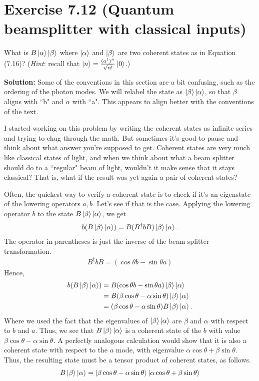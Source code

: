 \documentclass{book}
\begin{document}
\section*{Exercise 7.12 (Quantum beamsplitter with classical inputs)}
    What is $B\ket{\alpha}\ket{\beta}$ where $\ket{\alpha}$ and $\ket{\beta}$ are two coherent states as in Equation (7.16)? (\emph{Hint}: recall that $\ket{n} = \frac{(a^\dagger)^n}{\sqrt{n!}}\ket{0}$.)

    \textbf{Solution:} Some of the conventions in this section are a bit confusing, such as the ordering of the photon modes. We will relabel the state as $\ket{\beta}\ket{\alpha}$, so that $\beta$ aligns with ``b" and $\alpha$ with ``a". This appears to align better with the conventions of the text. 

    I started working on this problem by writing the coherent states as infinite series and trying to chug through the math. But sometimes it's good to pause and think about what answer you're supposed to get. Coherent states are very much like classical states of light, and when we think about what a beam splitter should do to a ``regular" beam of light, wouldn't it make sense that it stays classical? That is, what if the result was yet again a pair of coherent states?

    Often, the quickest way to verify a coherent state is to check if it's an eigenstate of the lowering operators $a,b$. Let's see if that is the case. Applying the lowering operator $b$ to the state $B\ket{\beta}\ket{\alpha}$, we get
    \begin{align}
        b (B \ket{\beta}\ket{\alpha}) = B (B^\dagger b B) \ket{\beta}\ket{\alpha}.
    \end{align}
    The operator in parentheses is just the inverse of the beam splitter transformation.
    \begin{align}
        B^\dagger b B = (\cos\theta b - \sin\theta a)
    \end{align}
    Hence, 
    \begin{align}
    \begin{aligned}
        b (B \ket{\beta}\ket{\alpha}) &= B (\cos\theta b - \sin\theta a) \ket{\beta}\ket{\alpha} \\
        &= B(\beta \cos\theta - \alpha \sin\theta) \ket{\beta}\ket{\alpha} \\
        &= (\beta \cos\theta - \alpha \sin\theta) B \ket{\beta}\ket{\alpha}.
    \end{aligned}
    \end{align}
    Where we used the fact that the eigenvalues of $\ket{\beta}\ket{\alpha}$ are $\beta$ and $\alpha$ with respect to $b$ and $a$. Thus, we see that $B \ket{\beta}\ket{\alpha}$ is a coherent state of the $b$ with value $\beta \cos\theta - \alpha \sin\theta$. A perfectly analogous calculation would show that it is also a coherent state with respect to the $a$ mode, with eigenvalue $\alpha \cos\theta + \beta \sin\theta$. Thus, the resulting state must be a tensor product of coherent states, as follows.
    \begin{align}
        B \ket{\beta} \ket{\alpha} = \ket{\beta \cos\theta - \alpha \sin\theta} \ket{\alpha \cos\theta + \beta \sin\theta}
    \end{align}
\end{document}
